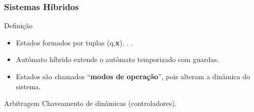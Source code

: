\begin{frame}
	\frametitle{Sistemas Híbridos}
	\begin{block}{Definição}
		\begin{itemize}
		  \item Estados formados por tuplas (q,\textbf{x}).
		  .
		  .
		  \item Autômato híbrido extende o autômato temporizado com guardas.
		  \item Estados são chamados ``\textbf{modos de operação}'', pois alteram a
		  dinâmica do sistema.
		\end{itemize}
	\end{block}
	\pause
	\begin{exampleblock}{Arbitragem}
		Chaveamento de dinâmicas (controladores).
	\end{exampleblock}
\end{frame}

\begin{frame}
	
\end{frame}

